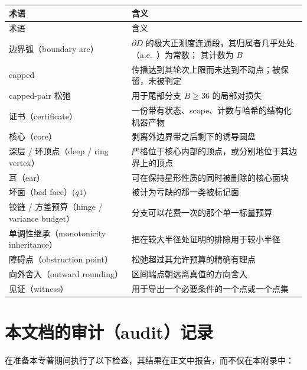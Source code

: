 {\footnotesize
\begin{longtable}{@{}>{\raggedright\arraybackslash}p{}>{\raggedright\arraybackslash}p{}@{}}
\toprule
术语 & 含义 \\
\midrule
\endfirsthead
\toprule
术语 & 含义 \\
\midrule
\endhead
\bottomrule
\endlastfoot
边界弧（boundary arc） & $\partial D$ 的极大正测度连通段，其归属者几乎处处（a.e.\ ）为常数；
其计数为 $B$ \\
capped & 传播达到其轮次上限而未达到不动点；被保留，未被判定 \\
capped-pair 松弛 & 用于尾部分支 $B\ge36$ 的局部对损失 \\
证书（certificate） & 一份带有状态、scope、计数与哈希的结构化机器产物 \\
核心（core） & 剥离外边界带之后剩下的诱导圆盘 \\
深层 / 环顶点（deep / ring vertex） & 严格位于核心内部的顶点，或分别地位于其边界上的顶点 \\
耳（ear） & 可在保持星形性质的同时被删除的核心面块 \\
坏面（bad face）($q1$) & 被计为亏缺的那一类被标记面 \\
铰链 / 方差预算（hinge / variance budget） & 分支可以花费一次的那个单一标量预算 \\
单调性继承（monotonicity inheritance） & 把在较大半径处证明的排除用于较小半径 \\
障碍点（obstruction point） & 松弛超过其允许预算的精确有理点 \\
向外舍入（outward rounding） & 区间端点朝远离真值的方向舍入 \\
见证（witness） & 用于导出一个必要条件的一个点或一个点集 \\
\end{longtable}}


\section{本文档的审计（audit）记录}

在准备本专著期间执行了以下检查，其结果在正文中报告，而不仅在本附录中：

